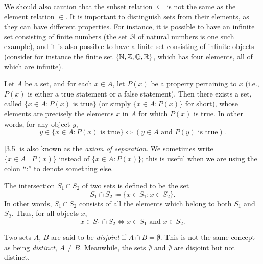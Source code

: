 \begin{rmk}\label{3.1.21}
  We should also caution that the subset relation \(\subseteq\) is not the same as the element relation \(\in\).
  It is important to distinguish sets from their elements, as they can have different properties.
  For instance, it is possible to have an infinite set consisting of finite numbers (the set \(\mathbb{N}\) of natural numbers is one such example), and it is also possible to have a finite set consisting of infinite objects
  (consider for instance the finite set \(\{\mathbb{N}, \mathbb{Z}, \mathbb{Q}, \mathbb{R}\}\), which has four elements, all of which are infinite).
\end{rmk}

\begin{ax}\label{3.5}
  Let \(A\) be a set, and for each \(x \in A\), let \(P(x)\) be a property pertaining to \(x\) (i.e., \(P(x)\) is either a true statement or a false statement).
  Then there exists a set, called \(\{x \in A : P(x) \text{ is true}\}\) (or simply \(\{x \in A : P(x)\}\) for short), whose elements are precisely the elements \(x\) in \(A\) for which \(P(x)\) is true.
  In other words, for any object \(y\),
  \[
    y \in \{x \in A : P(x) \text{ is true}\} \iff (y \in A \text{ and } P(y) \text{ is true}).
  \]
\end{ax}

\begin{note}
  \cref{3.5} is also known as the \emph{axiom of separation}.
  We sometimes write \(\{x \in A \mid P(x)\}\) instead of \(\{x \in A : P(x)\}\);
  this is useful when we are using the colon ``:'' to denote something else.
\end{note}

\setcounter{thm}{22}
\begin{defn}[Intersections]\label{3.1.23}
  The intersection \(S_1 \cap S_2\) of two sets is defined to be the set
  \[
    S_1 \cap S_2 \coloneqq \{x \in S_1 : x \in S_2\}.
  \]
  In other words, \(S_1 \cap S_2\) consists of all the elements which belong to both \(S_1\) and \(S_2\).
  Thus, for all objects \(x\),
  \[
    x \in S_1 \cap S_2 \iff x \in S_1 \text{ and } x \in S_2.
  \]
\end{defn}

\begin{note}
  Two sets \(A\), \(B\) are said to be \emph{disjoint} if \(A \cap B = \emptyset\).
  This is not the same concept as being \emph{distinct}, \(A \neq B\).
  Meanwhile, the sets \(\emptyset\) and \(\emptyset\) are disjoint but not distinct.
\end{note}

